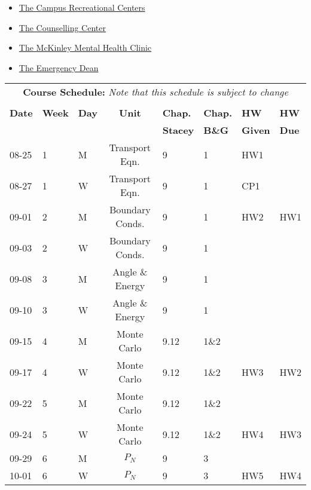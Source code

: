 \documentclass[11pt, a4paper]{article}
\begin{document}
\begin{itemize}
\item \href{https://campusrec.illinois.edu/}{The Campus Recreational Centers}
\item \href{http://counselingcenter.illinois.edu/}{The Counselling Center}
\item \href{http://www.mckinley.illinois.edu/clinics/mental\_health.htm}{The McKinley Mental Health Clinic}
\item \href{http://odos.illinois.edu/emergency/}{The Emergency Dean}
\end{itemize}

\pagebreak
\FloatBarrier
\renewcommand{\arraystretch}{1}
\begin{table}[h]
\begin{center}
\begin{tabular}{lllcllll}
\multicolumn{8}{c}{\textbf{Course Schedule:}\textit{ Note that this schedule is subject to change}}\\
&&&&&&&\\
\textbf{Date} & \textbf{Week} & \textbf{Day} & \textbf{Unit} & \textbf{Chap.} & \textbf{Chap.} & \textbf{HW} & \textbf{HW}\\
              &  &  & & \textbf{Stacey}& \textbf{B\&G} & \textbf{Given} & \textbf{Due}\\
\hline
\hline
08-25 & 1 & M  & Transport Eqn.          & 9    & 1    & HW1 & \\
08-27 & 1 & W  & Transport Eqn.          & 9    & 1    & CP1 & \\
09-01 & 2 & M  & Boundary Conds.         & 9    & 1    & HW2 & HW1\\
09-03 & 2 & W  & Boundary Conds.         & 9    & 1    &     & \\
09-08 & 3 & M  & Angle \& Energy         & 9    & 1    &     & \\
09-10 & 3 & W  & Angle \& Energy         & 9    & 1    &     & \\
09-15 & 4 & M  & Monte Carlo             & 9.12 & 1\&2 &     & \\
09-17 & 4 & W  & Monte Carlo             & 9.12 & 1\&2 & HW3 & HW2\\
09-22 & 5 & M  & Monte Carlo             & 9.12 & 1\&2 &     & \\
09-24 & 5 & W  & Monte Carlo             & 9.12 & 1\&2 & HW4 & HW3\\
09-29 & 6 & M  & $P_N$                   & 9    & 3    &     & \\
10-01 & 6 & W  & $P_N$                   & 9    & 3    & HW5 & HW4 \\

\end{tabular}
\end{center}
\end{table}
\end{document}
